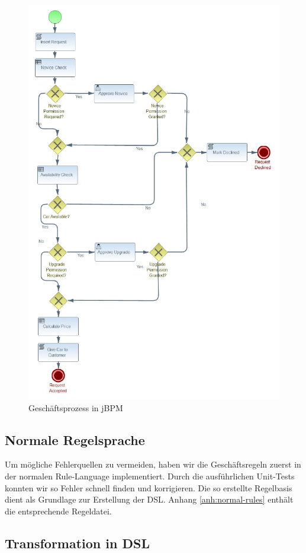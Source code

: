 \begin{figure}[tbh]
\centering
\includegraphics[width=0.8\linewidth]{Bilder/Process_BPMN}
\caption{Geschäftsprozess in jBPM}
\label{fig:Process_BPMN}
\end{figure}

\subsection{Normale Regelsprache}

Um mögliche Fehlerquellen zu vermeiden, haben wir die Geschäftsregeln zuerst
in der normalen Rule-Language implementiert. Durch die ausführlichen Unit-Tests
konnten wir so Fehler schnell finden und korrigieren. Die so erstellte Regelbasis
dient als Grundlage zur Erstellung der DSL. Anhang \ref{anh:normal-rules} enthält
die entsprechende Regeldatei.

\subsection{Transformation in DSL}

